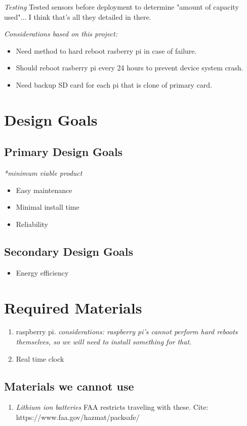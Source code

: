 \documentclass[12pt, letterpaper]{article}
\begin{document}
\textit{Testing} Tested sensors before deployment to determine "amount of capacity used"...
%
I think that's all they detailed in there.


\textit{Considerations based on this project:}
%
\begin{itemize}
%
\item Need method to hard reboot rasberry pi in case of failure.
\item Should reboot rasberry pi every 24 hours to prevent device system crash.
\item Need backup SD card for each pi that is clone of primary card.
%
\end{itemize}


\section{Design Goals}
%
\subsection{Primary Design Goals}
%
\textit{*minimum viable product}
%
\begin{itemize}
%
\item Easy maintenance
%
\item Minimal install time
%
\item Reliability
%
\end{itemize}
%

\subsection{Secondary Design Goals}
%
\begin{itemize}
%
\item Energy efficiency
%
\end{itemize}


\section{Required Materials}
\begin{enumerate}
\item raspberry pi. \textit{considerations: raspberry pi's cannot perform hard reboots themselves,
so we will need to install something for that.}
\item Real time clock
\end{enumerate}

\subsection{Materials we cannot use}
\begin{enumerate}
\item \textit{Lithium ion batteries} FAA restricts traveling with these. Cite: https://www.faa.gov/hazmat/packsafe/
\end{enumerate}
\end{document}
